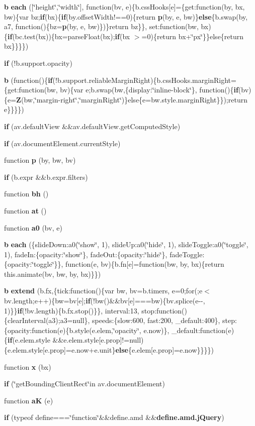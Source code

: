 \begin{DoxyCompactItemize}
{\bf b} {\bf each} ([\char`\"{}height\char`\"{},\char`\"{}width\char`\"{}], function(bv, e)\{b.\-css\-Hooks[e]=\{get\-:function(by, bx, bw)\{var bz;{\bf if}(bx)\{{\bf if}(by.\-offset\-Width!==0)\{return {\bf p}(by, e, bw)\}{\bf else}\{b.\-swap(by, a7, function()\{bz={\bf p}(by, e, bw)\})\}return bz\}\}, set\-:function(bw, bx)\{{\bf if}(bc.\-test(bx))\{bx=parse\-Float(bx);{\bf if}(bx $>$=0)\{return bx+\char`\"{}px\char`\"{}\}\}else\{return bx\}\}\}\})
\item 
{\bf if} (!b.\-support.\-opacity)
\item 
{\bf b} (function()\{{\bf if}(!b.\-support.\-reliable\-Margin\-Right)\{b.\-css\-Hooks.\-margin\-Right=\{get\-:function(bw, bv)\{var e;b.\-swap(bw,\{display\-:\char`\"{}inline-\/block\char`\"{}\}, function()\{{\bf if}(bv)\{e={\bf Z}(bw,\char`\"{}margin-\/right\char`\"{},\char`\"{}margin\-Right\char`\"{})\}else\{e=bw.\-style.\-margin\-Right\}\});return e\}\}\}\})
\item 
{\bf if} (av.\-default\-View \&\&av.\-default\-View.\-get\-Computed\-Style)
\item 
{\bf if} (av.\-document\-Element.\-current\-Style)
\item 
function {\bf p} (by, bw, bv)
\item 
{\bf if} (b.\-expr \&\&b.\-expr.\-filters)
\item 
function {\bf bh} ()
\item 
function {\bf at} ()
\item 
function {\bf a0} (bv, e)
\item 
{\bf b} {\bf each} (\{slide\-Down\-:a0(\char`\"{}show\char`\"{}, 1), slide\-Up\-:a0(\char`\"{}hide\char`\"{}, 1), slide\-Toggle\-:a0(\char`\"{}toggle\char`\"{}, 1), fade\-In\-:\{opacity\-:\char`\"{}show\char`\"{}\}, fade\-Out\-:\{opacity\-:\char`\"{}hide\char`\"{}\}, fade\-Toggle\-:\{opacity\-:\char`\"{}toggle\char`\"{}\}\}, function(e, bv)\{b.\-fn[e]=function(bw, by, bx)\{return this.\-animate(bv, bw, by, bx)\}\})
\item 
{\bf b} {\bf extend} (b.\-fx,\{tick\-:function()\{var bw, bv=b.\-timers, e=0;for(;e$<$ bv.\-length;e++)\{bw=bv[e];{\bf if}(!bw()\&\&bv[e]===bw)\{bv.\-splice(e-\/-\/, 1)\}\}{\bf if}(!bv.\-length)\{b.\-fx.\-stop()\}\}, interval\-:13, stop\-:function()\{clear\-Interval(a3);a3=null\}, speeds\-:\{slow\-:600, fast\-:200, \-\_\-default\-:400\}, step\-:\{opacity\-:function(e)\{b.\-style(e.\-elem,\char`\"{}opacity\char`\"{}, e.\-now)\}, \-\_\-default\-:function(e)\{{\bf if}(e.\-elem.\-style \&\&e.\-elem.\-style[e.\-prop]!=null)\{e.\-elem.\-style[e.\-prop]=e.\-now+e.\-unit\}{\bf else}\{e.\-elem[e.\-prop]=e.\-now\}\}\}\})
\item 
function {\bf x} (bx)
\item 
{\bf if} (\char`\"{}get\-Bounding\-Client\-Rect\char`\"{}in av.\-document\-Element)
\item 
function {\bf a\-K} (e)
\item 
{\bf if} (typeof define===\char`\"{}function\char`\"{}\&\&define.\-amd \&\&{\bf define.\-amd.\-j\-Query})
\end{DoxyCompactItemize}
